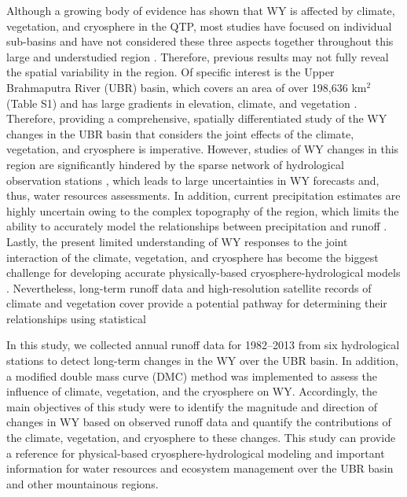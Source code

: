 \documentclass[hess, manuscript]{copernicus}
\begin{document}
Although a growing body of evidence has shown that WY is affected by climate, vegetation, and cryosphere in the QTP, most studies have focused on individual sub-basins and have not considered these three aspects together throughout this large and understudied region \citep{dierauer2018climate, goulden2014mountain,kraaijenbrink2021climate, song2021river,zhou2021divergent}. 
Therefore, previous results may not fully reveal the spatial variability in the region. Of specific interest is the Upper Brahmaputra River (UBR) basin, which covers an area of over 198,636 km$^2$ (Table S1) and has large gradients in elevation, climate, and vegetation \citep{li2019spatiotemporal}.
Therefore, providing a comprehensive, spatially differentiated study of the WY changes in the UBR basin that considers the joint effects of the climate, vegetation, and cryosphere is imperative. However, studies of WY changes in this region are significantly hindered by the sparse network of hydrological observation stations \citep{li2019spatiotemporal,wang2021tp,yao2019recent}, which leads to large uncertainties in WY forecasts and, thus, water resources assessments.
In addition, current precipitation estimates are highly uncertain owing to the complex topography of the region, which limits the ability to accurately model the relationships between precipitation and runoff \citep{sun2020precipitation}. 
Lastly, the present limited understanding of WY responses to the joint interaction of the climate, vegetation, and cryosphere has become the biggest challenge for developing accurate physically-based cryosphere-hydrological models \citep{pellicciotti2012challenges}. Nevertheless, long-term runoff data and high-resolution satellite records of climate and vegetation cover provide a potential pathway for determining their relationships using statistical 

In this study, we collected annual runoff data for 1982--2013 from six hydrological stations to detect long-term changes in the WY over the UBR basin. In addition, a modified double mass curve (DMC) method was implemented to assess the influence of climate, vegetation, and the cryosphere on WY. 
Accordingly, the main objectives of this study were to identify the magnitude and direction of changes in WY based on observed runoff data and quantify the contributions of the climate, vegetation, and cryosphere to these changes.
This study can provide a reference for physical-based cryosphere-hydrological modeling and important information for water resources and ecosystem management over the UBR basin and other mountainous regions. 
\end{document}
